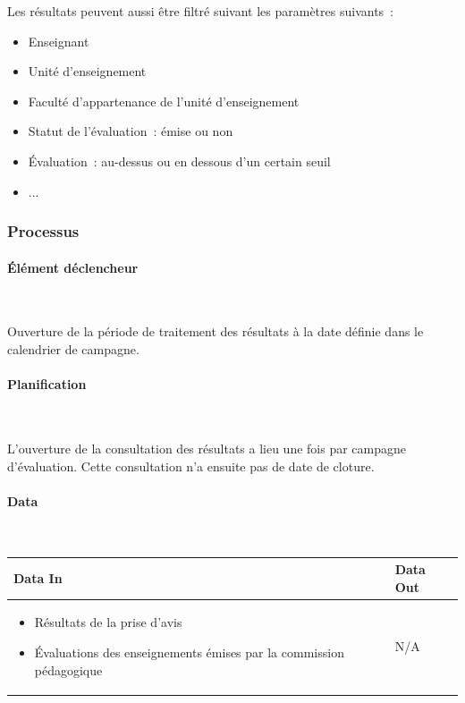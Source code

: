 \documentclass[a4paper,11pt]{report}
\begin{document}
Les résultats peuvent aussi être filtré suivant les paramètres suivants~:
\begin{itemize}
	\item Enseignant
	\item Unité d'enseignement
	\item Faculté d'appartenance de l'unité d'enseignement
	\item Statut de l'évaluation~: émise ou non
	\item Évaluation~: au-dessus ou en dessous d'un certain seuil
	\item ...
\end{itemize}

\subsubsection{Processus}
\paragraph{Élément déclencheur}~\newline{}

Ouverture de la période de traitement des résultats à la date définie dans le calendrier de campagne.

\paragraph{Planification}~\newline{}

L'ouverture de la consultation des résultats a lieu une fois par campagne d'évaluation.
Cette consultation n'a ensuite pas de date de cloture.

\paragraph{Data}~\newline{}

\begin{tabularx}{\linewidth}{|X|X|} \hline
Data In & Data Out \\ \hline
\begin{itemize}
	\item Résultats de la prise d'avis
	\item Évaluations des enseignements émises par la commission pédagogique \newline{}
\end{itemize}
& N/A \\ \hline
\end{tabularx}
\end{document}
